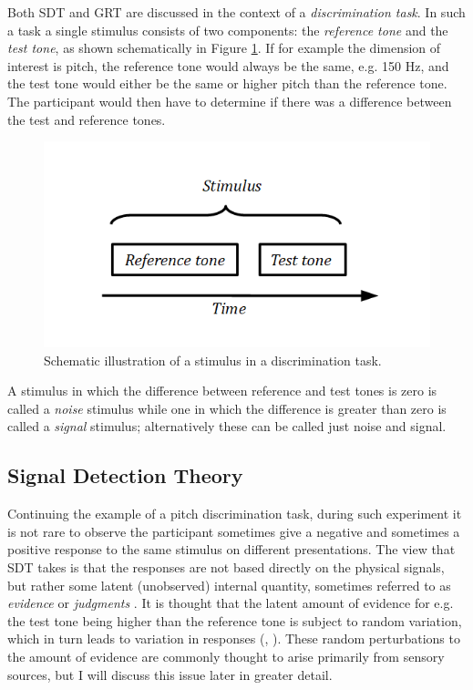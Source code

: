 \documentclass{article}\usepackage{knitr}
\begin{document}
Both SDT and GRT are discussed in the context of a \textit{discrimination task}. In such a task a single stimulus consists of two components: the \textit{reference tone} and the \textit{test tone}, as shown schematically  in Figure \ref{fig:discrtask}. If for example the dimension of interest is pitch, the reference tone would always be the same, e.g. 150 Hz, and the test tone would either be the same or higher pitch than the reference tone. The participant would then have to determine if there was a difference between the test and reference tones.

\begin{figure}[!htb]
\centering
\includegraphics[scale = 0.5]{DiscriminationTask}
\caption{Schematic illustration of a stimulus in a discrimination task.}
\label{fig:discrtask}
\end{figure}

A stimulus in which the difference between reference and test tones is zero is called a \textit{noise} stimulus while one in which the difference is greater than zero is called a \textit{signal} stimulus; alternatively these can be called just noise and signal. 

\subsection{Signal Detection Theory}

Continuing the example of a  pitch discrimination task, during such experiment it is not rare to observe the participant sometimes give a negative and sometimes a positive response to the same stimulus on different presentations. The view that SDT takes is that the responses are not based directly on the physical signals, but rather some latent (unobserved) internal quantity, sometimes referred to as \textit{evidence} \citep{wickens2002} or \textit{judgments} \cite{stigler2003}. It is thought that the latent amount of evidence for e.g. the test tone being higher than the reference tone is subject to random variation, which in turn leads to variation in responses (\citet[p. 154]{kingdomprins2010}, \citet[p. 11]{wickens2002}). These random perturbations to the amount of evidence are commonly thought to arise primarily from sensory sources, but I will discuss this issue later in greater detail.
\end{document}
